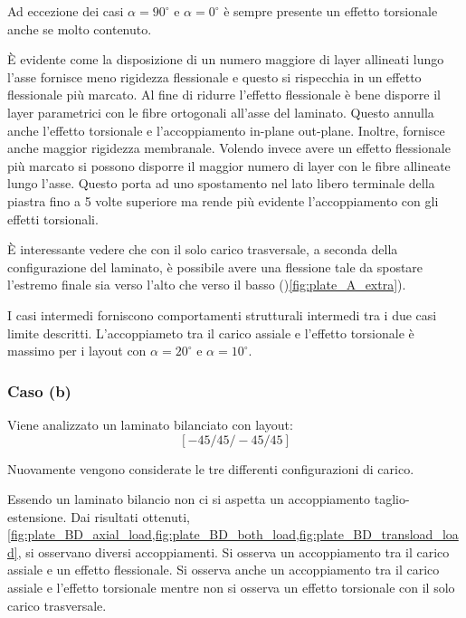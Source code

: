 \documentclass[a4paper,num-refs]{oup-contemporary}
\begin{document}
Ad eccezione dei casi  $\alpha=90^\circ$ e $\alpha=0^\circ$ è sempre presente un effetto torsionale anche se molto contenuto. 

È evidente come la disposizione di un numero maggiore di layer allineati lungo l'asse fornisce meno rigidezza flessionale e questo si rispecchia in un effetto flessionale più marcato. Al fine di ridurre l'effetto flessionale è bene disporre il layer parametrici con  le fibre ortogonali all'asse del laminato. Questo annulla anche l'effetto torsionale e l'accoppiamento in-plane out-plane. Inoltre, fornisce anche maggior rigidezza membranale. Volendo invece avere un effetto flessionale più marcato si possono disporre il maggior numero di layer con le fibre allineate lungo l'asse. Questo porta ad uno spostamento nel lato libero terminale della piastra fino a 5 volte superiore ma rende più evidente l'accoppiamento con gli effetti torsionali. 

È interessante vedere che con il solo carico trasversale, a seconda della configurazione del laminato, è possibile avere una flessione tale da spostare l'estremo finale sia verso l'alto che verso il basso ()\cref{fig:plate_A_extra}). 

I casi intermedi forniscono comportamenti strutturali intermedi tra i due casi limite descritti. L'accoppiameto tra il carico assiale e l'effetto torsionale è massimo per i layout con   $\alpha=20^\circ$ e $\alpha=10^\circ$. 



\subsubsection{Caso (b)}
\label{sec:plate_B}
Viene analizzato un laminato bilanciato con layout:
\begin{equation}
\left[-45 / 45 /-45 / 45\right]
\end{equation}

Nuovamente vengono considerate le tre differenti configurazioni di carico. 

Essendo un laminato bilancio non ci si aspetta un accoppiamento taglio-estensione. Dai risultati ottenuti, \cref{fig:plate_BD_axial_load,fig:plate_BD_both_load,fig:plate_BD_transload_load}, si osservano diversi accoppiamenti. Si osserva un accoppiamento tra il carico assiale e un effetto flessionale. Si osserva anche un accoppiamento tra il carico assiale e l'effetto torsionale mentre non si osserva un effetto torsionale con il solo carico trasversale. 
\end{document}
